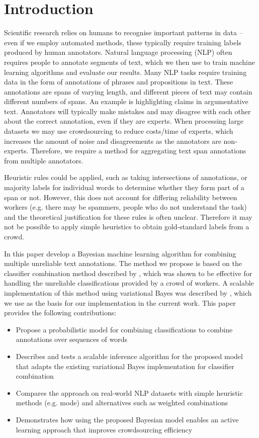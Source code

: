 \section{Introduction}\label{sec:intro}

Scientific research relies on humans to recognise important patterns in data – even if we employ automated methods, these typically require training labels produced by human annotators. 
Natural language processing (NLP) often requires people to annotate segments of text, which we then use to train machine learning algorithms and evaluate our results.
Many NLP tasks require training data in the form of annotations of phrases and propositions in text. These annotations are spans of varying length, and different pieces of text may contain different numbers of spans. An example is highlighting claims in argumentative text. Annotators will typically make mistakes and may disagree with each other about the correct annotation, even if they are experts. When processing large datasets we may use crowdsourcing to reduce costs/time of experts, which increases the amount of noise and disagreements as the annotators are non-experts. Therefore, we require a method for aggregating text span annotations from multiple annotators.

Heuristic rules could be applied, such as taking intersections of annotations, or majority labels for individual words to determine whether they form part of a span or not. However, this does not account for differing reliability between workers (e.g. there may be spammers, people who do not understand the task) and the theoretical justification for these rules is often unclear. Therefore it may not be possible to apply simple heuristics to obtain gold-standard labels from a crowd. 

In this paper develop a Bayesian machine learning algorithm for combining multiple unreliable text annotations.
The method we propose is based on the classifier combination method described by \cite{kim2012bayesian}, 
which was shown to be effective for handling the unreliable classifications provided by a crowd of workers. A scalable implementation of this method using variational Bayes was described by \cite{simpsonlong}, which we use as the basis for our implementation in the current work. This paper provides the following contributions:
\begin{itemize}
  \item Propose a probabilistic model for combining classifications to combine annotations over sequences of words
  \item Describes and tests a scalable inference algorithm for the proposed model that adapts the existing variational Bayes implementation for classifier combination
  \item Compares the approach on real-world NLP datasets with simple heuristic methods (e.g. mode) and alternatives such as weighted combinations
  \item Demonstrates how using the proposed Bayesian model enables an active learning approach that improves crowdsourcing efficiency
\end{itemize}


